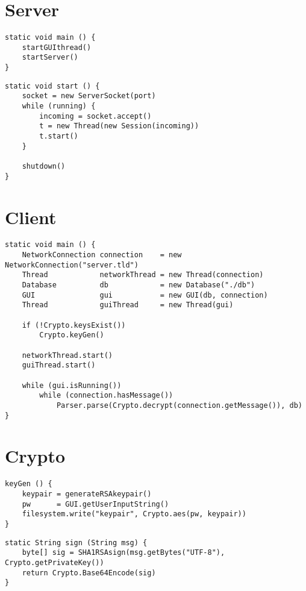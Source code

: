 \section{Server}
\begin{lstlisting}
static void main () {
    startGUIthread()
    startServer()
}
\end{lstlisting}

\begin{lstlisting}
static void start () {
    socket = new ServerSocket(port)
    while (running) {
        incoming = socket.accept()
        t = new Thread(new Session(incoming))
        t.start()
    }
    
    shutdown()
}
\end{lstlisting}

\section{Client}
\begin{lstlisting}
static void main () {
    NetworkConnection connection    = new NetworkConnection("server.tld")
    Thread            networkThread = new Thread(connection)
    Database          db            = new Database("./db")
    GUI               gui           = new GUI(db, connection)
    Thread            guiThread     = new Thread(gui)
        
    if (!Crypto.keysExist())
        Crypto.keyGen()
        
    networkThread.start()
    guiThread.start()
        
    while (gui.isRunning())
        while (connection.hasMessage())
            Parser.parse(Crypto.decrypt(connection.getMessage()), db)
}
\end{lstlisting}

\section{Crypto}
\begin{lstlisting}
keyGen () {
    keypair = generateRSAkeypair()
    pw      = GUI.getUserInputString()
    filesystem.write("keypair", Crypto.aes(pw, keypair))
}
\end{lstlisting}

\begin{lstlisting}
static String sign (String msg) {
    byte[] sig = SHA1RSAsign(msg.getBytes("UTF-8"), Crypto.getPrivateKey())
    return Crypto.Base64Encode(sig)
}
\end{lstlisting}

